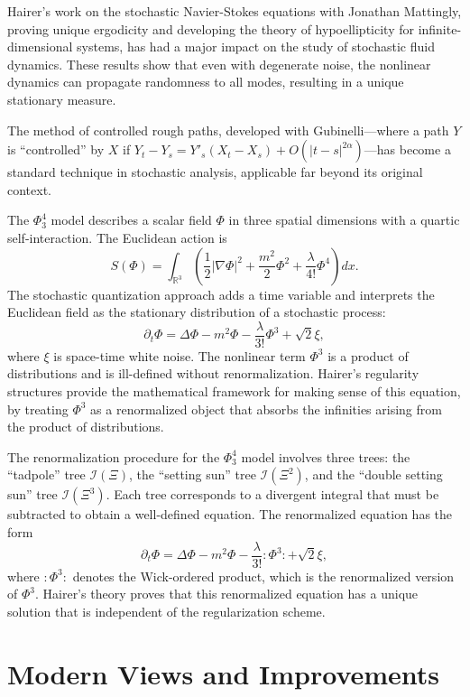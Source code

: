 Hairer's work on the stochastic Navier-Stokes equations with Jonathan Mattingly, proving unique ergodicity and developing the theory of hypoellipticity for infinite-dimensional systems, has had a major impact on the study of stochastic fluid dynamics. These results show that even with degenerate noise, the nonlinear dynamics can propagate randomness to all modes, resulting in a unique stationary measure.

The method of controlled rough paths, developed with Gubinelli---where a path $Y$ is ``controlled'' by $X$ if $Y_t - Y_s = Y'_s(X_t - X_s) + O(|t-s|^{2\alpha})$---has become a standard technique in stochastic analysis, applicable far beyond its original context.

The $\Phi^4_3$ model describes a scalar field $\Phi$ in three spatial dimensions with a quartic self-interaction. The Euclidean action is
\[
S(\Phi) = \int_{\mathbb{R}^3} \left(\frac{1}{2}|\nabla\Phi|^2 + \frac{m^2}{2}\Phi^2 + \frac{\lambda}{4!}\Phi^4\right) dx.
\]
The stochastic quantization approach adds a time variable and interprets the Euclidean field as the stationary distribution of a stochastic process:
\[
\partial_t \Phi = \Delta\Phi - m^2\Phi - \frac{\lambda}{3!}\Phi^3 + \sqrt{2}\xi,
\]
where $\xi$ is space-time white noise. The nonlinear term $\Phi^3$ is a product of distributions and is ill-defined without renormalization. Hairer's regularity structures provide the mathematical framework for making sense of this equation, by treating $\Phi^3$ as a renormalized object that absorbs the infinities arising from the product of distributions.

The renormalization procedure for the $\Phi^4_3$ model involves three trees: the ``tadpole'' tree $\mathcal{I}(\Xi)$, the ``setting sun'' tree $\mathcal{I}(\Xi^2)$, and the ``double setting sun'' tree $\mathcal{I}(\Xi^3)$. Each tree corresponds to a divergent integral that must be subtracted to obtain a well-defined equation. The renormalized equation has the form
\[
\partial_t \Phi = \Delta\Phi - m^2\Phi - \frac{\lambda}{3!}:\!\Phi^3\!: + \sqrt{2}\xi,
\]
where $:\!\Phi^3\!:$ denotes the Wick-ordered product, which is the renormalized version of $\Phi^3$. Hairer's theory proves that this renormalized equation has a unique solution that is independent of the regularization scheme.

\section{Modern Views and Improvements}

